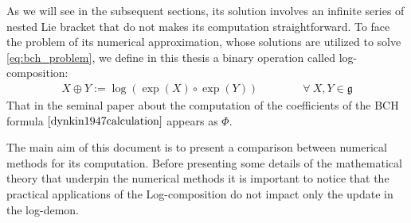 As we will see in the subsequent sections, its solution involves an infinite series of nested Lie bracket that do not makes its computation straightforward. 
To face the problem of its numerical approximation, whose solutions are utilized to solve \ref{eq:bch_problem}, we define in this thesis a binary operation called log-composition:
\begin{align*}
X \oplus Y := \log(\exp(X)\circ\exp( Y))
\qquad \qquad
\forall ~X, Y \in \mathfrak{g}
\end{align*}
That in the seminal paper about the computation of the coefficients of the BCH formula $\cite{dynkin1947calculation}$ appears as $\Phi$.

The main aim of this document is to present a comparison between numerical methods for its computation.
Before presenting some details of the mathematical theory that underpin the numerical methods it is important to notice that the practical applications of the Log-composition do not impact only the update in the log-demon.

